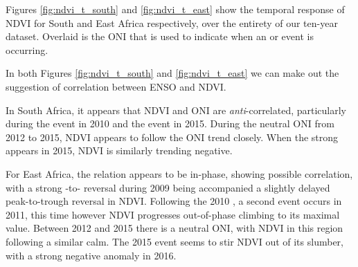 Figures \ref{fig:ndvi_t_south} and \ref{fig:ndvi_t_east} show the
temporal response of NDVI for South and East Africa respectively, over
the entirety of our ten-year dataset. Overlaid is the ONI that
is used to indicate when an \elnino{} or \nina{} event is occurring.

In both Figures \ref{fig:ndvi_t_south} and \ref{fig:ndvi_t_east} we
can make out the suggestion of correlation between ENSO and NDVI.

In South Africa, it appears that NDVI and ONI are
\emph{anti}-correlated, particularly during the \nina{} event in 2010
and the \elnino{} event in 2015. During the neutral ONI from 2012 to
2015, NDVI appears to follow the ONI trend closely. When the strong
\elnino{} appears in 2015, NDVI is similarly trending negative.

For East Africa, the relation appears to be in-phase, showing possible
correlation, with a strong \elnino{}-to-\nina{} reversal during 2009
being accompanied a slightly delayed peak-to-trough reversal in
NDVI. Following the 2010 \nina{}, a second \nina{} event occurs in
2011, this time however NDVI progresses out-of-phase climbing to its
maximal value. Between 2012 and 2015 there is a neutral ONI, with NDVI
in this region following a similar calm. The 2015 \elnino{} event
seems to stir NDVI out of its slumber, with a strong negative anomaly
in 2016.

